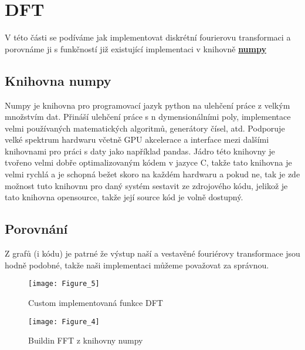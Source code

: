 \section{DFT}

V této části se podíváme jak implementovat diskrétní fourierovu transformaci a porovnáme ji s funkčností již existující implementaci v knihovně \hyperref[subs:numpy]{\textbf{numpy}}

\subsection{Knihovna numpy}
\label{subs:numpy}

Numpy je knihovna pro programovací jazyk python na ulehčení práce z velkým množstvím dat. Přináší ulehčení práce s n dymensionálními poly, implementace velmi používaných matematických algoritmů, generátory čísel, atd.
Podporuje velké spektrum hardwaru včetně GPU akcelerace a interface mezi dalšími knihovnami pro práci s daty jako například pandas.
Jádro této knihovny je tvořeno velmi dobře optimalizovaným kódem v jazyce C, takže tato knihovna je velmi rychlá a je schopná bežet skoro na každém hardwaru a pokud ne, tak je zde možnost tuto knihovnu pro daný systém sestavit ze zdrojového kódu, jelikož je tato knihovna opensource, takže její source kód je volně dostupný.

\subsection{Porovnání}
Z grafů (i kódu) je patrné že výstup naší a vestavěné fouriérovy transformace jsou hodně podobné, takže naši implementaci můžeme považovat za správnou.

\begin{landscape}
\begin{figure}[H]
	\centering
	\texttt{[image: Figure\_5]}
	\caption{Custom implementovaná funkce DFT}
\end{figure}
\end{landscape}

\begin{landscape}
\begin{figure}[H] 
	\centering
	\texttt{[image: Figure\_4]}
	\caption{Buildin FFT z knihovny numpy}
\end{figure}
\end{landscape}